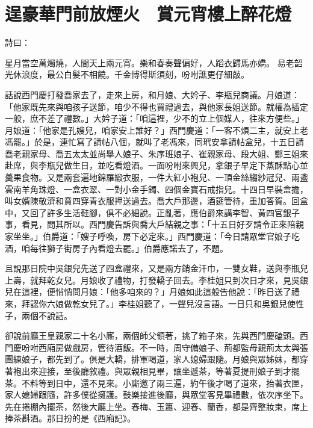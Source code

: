 %

\chapter{逞豪華門前放煙火　賞元宵樓上醉花燈}

詩曰：

星月當空萬燭燒，人間天上兩元宵。樂和春奏聲偏好，人蹈衣歸馬亦嬌。
易老韶光休浪度，最公白髮不相饒。千金博得斯須刻，吩咐譙更仔細敲。

話說西門慶打發喬家去了，走來上房，和月娘、大妗子、李瓶兒商議。月娘道：「他家既先來與咱孩子送節，咱少不得也買禮過去，與他家長姐送節。就權為插定一般，庶不差了禮數。」大妗子道：「咱這裡，少不的立上個媒人，往來方便些。」月娘道：「他家是孔嫂兒，咱家安上誰好？」西門慶道：「一客不煩二主，就安上老馮罷。」於是，連忙寫了請帖八個，就叫了老馮來，同玳安拿請帖盒兒，十五日請喬老親家母、喬五太太並尚舉人娘子、朱序班娘子、崔親家母、段大姐、鄭三姐來赴席，與李瓶兒做生日，並吃看燈酒。一面吩咐來興兒，拿銀子早定下蒸酥點心並羹果食物。又是兩套遍地錦羅緞衣服，一件大紅小袍兒、一頂金絲縐紗冠兒、兩盞雲南羊角珠燈、一盒衣翠、一對小金手鐲、四個金寶石戒指兒。十四日早裝盒擔，叫女婿陳敬濟和賁四穿青衣服押送過去。喬大戶那邊，酒筵管待，重加答賀。回盒中，又回了許多生活鞋腳，俱不必細說。正亂著，應伯爵來講李智、黃四官銀子事，看見，問其所以。西門慶告訴與喬大戶結親之事：「十五日好歹請令正來陪親家坐坐。」伯爵道：「嫂子呼喚，房下必定來。」西門慶道：「今日請眾堂官娘子吃酒，咱每往獅子街房子內看燈去罷。」伯爵應諾去了，不題。

且說那日院中吳銀兒先送了四盒禮來，又是兩方銷金汗巾，一雙女鞋，送與李瓶兒上壽，就拜乾女兒。月娘收了禮物，打發轎子回去。李桂姐只到次日才來，見吳銀兒在這裡，便悄悄問月娘：「他多咱來的？」月娘如此這般告他說：「昨日送了禮來，拜認你六娘做乾女兒了。」李桂姐聽了，一聲兒沒言語。一日只和吳銀兒使性子，兩個不說話。

卻說前廳王皇親家二十名小廝，兩個師父領著，挑了箱子來，先與西門慶磕頭。西門慶吩咐西廂房做戲房，管待酒飯。不一時，周守備娘子、荊都監母親荊太太與張團練娘子，都先到了。俱是大轎，排軍喝道，家人媳婦跟隨。月娘與眾姊妹，都穿著袍出來迎接，至後廳敘禮。與眾親相見畢，讓坐遞茶，等著夏提刑娘子到才擺茶。不料等到日中，還不見來。小廝邀了兩三遍，約午後才喝了道來，抬著衣匣，家人媳婦跟隨，許多僕從擁護。鼓樂接進後廳，與眾堂客見畢禮數，依次序坐下。先在捲棚內擺茶，然後大廳上坐。春梅、玉簫、迎春、蘭香，都是齊整妝束，席上捧茶斟酒。那日扮的是《西廂記》。

